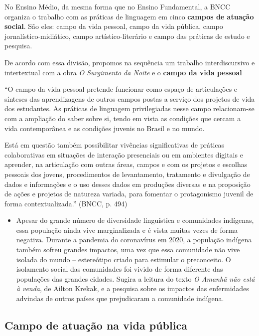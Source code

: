 \documentclass[12pt]{extarticle}
\begin{document}

No Ensino Médio, da mesma forma que no Ensino Fundamental, a BNCC
organiza o trabalho com as práticas de linguagem em cinco \textbf{campos
de atuação social}. São eles: campo da vida pessoal, campo da vida
pública, campo jornalístico-midiático, campo artístico-literário e campo
das práticas de estudo e pesquisa.

De acordo com essa divisão, propomos na sequência um trabalho
interdiscursivo e intertextual com a obra \emph{O Surgimento da Noite} e o \textbf{campo da vida pessoal}

``O campo da vida pessoal pretende funcionar como espaço de articulações
e sínteses das aprendizagens de outros campos postas a serviço dos
projetos de vida dos estudantes. As práticas de linguagem privilegiadas
nesse campo relacionam-se com a ampliação do saber sobre si, tendo em
vista as condições que cercam a vida contemporânea e as condições
juvenis no Brasil e no mundo.

Está em questão também possibilitar vivências significativas de práticas
colaborativas em situações de interação presenciais ou em ambientes
digitais e aprender, na articulação com outras áreas, campos e com os
projetos e escolhas pessoais dos jovens, procedimentos de levantamento,
tratamento e divulgação de dados e informações e o uso desses dados em
produções diversas e na proposição de ações e projetos de natureza
variada, para fomentar o protagonismo juvenil de forma
contextualizada.'' (BNCC, p. 494)

\begin{itemize}
\item
  Apesar do grande número de diversidade linguística e comunidades
  indígenas, essa população ainda vive marginalizada e é vista muitas
  vezes de forma negativa. Durante a pandemia do coronavírus em 2020, a
  população indígena também sofreu grandes impactos, uma vez que essa
  comunidade não vive isolada do mundo -- estereótipo criado para
  estimular o preconceito. O isolamento social das comunidades foi
  vivido de forma diferente das populações das grandes cidades. Sugira a
  leitura do texto \emph{O Amanhã não está à venda}, de Ailton Krekak, e a
  pesquisa sobre os impactos das enfermidades advindas de outros países
  que prejudicaram a comunidade indígena.
\end{itemize}


\subsection{Campo de atuação na vida pública}
\end{document}
